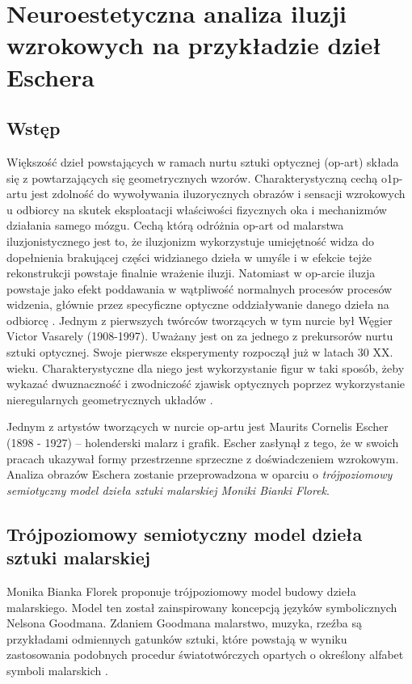 \documentclass[licencjacka]{kdypl}
\begin{document}
\chapter{Neuroestetyczna analiza iluzji wzrokowych na przykładzie dzieł Eschera}
\section{Wstęp}



 Większość dzieł powstających w ramach nurtu sztuki optycznej (op-art) składa się z powtarzających się geometrycznych wzorów. Charakterystyczną cechą o1p-artu jest zdolność do wywoływania iluzorycznych obrazów i sensacji wzrokowych u odbiorcy na skutek eksploatacji właściwości fizycznych oka i mechanizmów działania samego mózgu. Cechą którą odróżnia op-art od malarstwa iluzjonistycznego jest to, że iluzjonizm wykorzystuje umiejętność widza do dopełnienia brakującej części widzianego dzieła w umyśle i w efekcie tejże rekonstrukcji powstaje finalnie wrażenie iluzji. Natomiast w op-arcie iluzja powstaje jako efekt poddawania w wątpliwość normalnych procesów procesów widzenia, głównie przez specyficzne optyczne oddziaływanie danego dzieła na odbiorcę \citep[s. 353-354]{Reichard}. Jednym z pierwszych twórców tworzących w tym nurcie był Węgier Victor Vasarely (1908-1997). Uważany jest on za jednego z prekursorów  nurtu sztuki optycznej. Swoje pierwsze eksperymenty rozpoczął już w latach 30 XX. wieku. Charakterystyczne dla niego jest wykorzystanie figur w taki sposób, żeby wykazać dwuznaczność i zwodniczość zjawisk optycznych poprzez wykorzystanie nieregularnych geometrycznych układów \citep[s. 356-358]{Reichard}.
 
 
Jednym z artystów tworzących w nurcie op-artu jest Maurits Cornelis Escher (1898 - 1927) -- holenderski malarz i grafik. Escher zasłynął z tego, że w swoich pracach ukazywał formy przestrzenne sprzeczne z doświadczeniem wzrokowym. Analiza obrazów Eschera zostanie przeprowadzona w oparciu o \textit{trójpoziomowy semiotyczny model dzieła sztuki malarskiej Moniki Bianki Florek}.


\section{Trójpoziomowy semiotyczny model dzieła sztuki malarskiej}

Monika Bianka Florek proponuje trójpoziomowy model budowy dzieła malarskiego. Model ten został zainspirowany koncepcją języków symbolicznych Nelsona Goodmana. Zdaniem Goodmana malarstwo, muzyka, rzeźba są przykładami odmiennych gatunków sztuki, które powstają w wyniku zastosowania podobnych procedur światotwórczych opartych o określony alfabet symboli malarskich \citep[s. 388]{Florek2006}.
\end{document}
